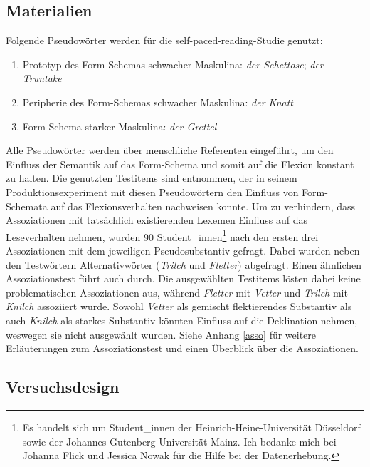 \subsection{Materialien}
\label{methschemamaterial}

Folgende Pseudowörter werden für die self-paced-reading-Studie genutzt:

\begin{enumerate}
\item Prototyp des Form-Schemas schwacher Maskulina: \textit{der Schettose}; \textit{der Truntake} 
\item Peripherie des Form-Schemas schwacher Maskulina: \textit{der Knatt} 
\item Form-Schema starker Maskulina: \textit{der Grettel}
\end{enumerate}

Alle Pseudowörter werden über menschliche Referenten eingeführt, um den Einfluss der Semantik auf das Form-Schema und somit auf die Flexion konstant zu halten. Die genutzten Testitems sind \textcite{Kopcke.2000b} entnommen, der in seinem Produktionsexperiment mit diesen Pseudowörtern den Einfluss von Form-Schemata auf das Flexionsverhalten nachweisen konnte. Um zu verhindern, dass Assoziationen mit tatsächlich existierenden Lexemen Einfluss auf das Leseverhalten nehmen, wurden 90 Student\_innen\footnote{Es handelt sich um Student\_innen der Heinrich-Heine-Universität Düsseldorf sowie der Johannes Gutenberg-Universität Mainz. Ich bedanke mich bei Johanna Flick und Jessica Nowak für die Hilfe bei der Datenerhebung.} nach den ersten drei Assoziationen mit dem jeweiligen Pseudosubstantiv gefragt. Dabei wurden neben den Testwörtern Alternativwörter (\textit{Trilch} und \textit{Fletter}) abgefragt. Einen ähnlichen Assoziationstest führt auch \textcite[160]{Kopcke.2000b} durch. Die ausgewählten Testitems lösten dabei keine problematischen Assoziationen aus, während \textit{Fletter} mit \textit{Vetter} und \textit{Trilch} mit \textit{Knilch} assoziiert wurde. Sowohl \textit{Vetter} als gemischt flektierendes Substantiv als auch \textit{Knilch} als starkes Substantiv könnten Einfluss auf die Deklination nehmen, weswegen sie nicht ausgewählt wurden. Siehe Anhang \ref{asso} für weitere Erläuterungen zum Assoziationstest und einen Überblick über die Assoziationen.

\subsection{Versuchsdesign}
\label{versuchspr}

